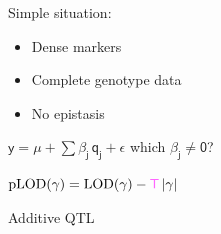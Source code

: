 \documentclass[12pt]{article}
\newcommand{\headsize}{\fontsize{35}{35} \selectfont}
\newcommand{\smallersize}{\fontsize{20}{25} \selectfont}
\newcommand{\smallestsize}{\fontsize{18}{22} \selectfont}
\newcommand{\lod}{\text{LOD}}
\newcommand{\plod}{\text{pLOD}}
\begin{document}
\hfill \begin{minipage}{10in}

Simple situation:

{\smallestsize
\color{myblue}
\begin{itemize}
\item Dense markers
\item Complete genotype data
\item No epistasis

\end{itemize} }

\vspace{2cm}

\centerline{
$\mathsf{y  = \mu + \sum \beta_j \, q_j + \epsilon}$ \hspace{1cm}
       {\color{mypink} which $\mathsf{\beta_j \ne 0}$?}
}

\vspace{2cm}

{\color{myyellow}
$\mathsf{ \plod(\gamma) = \lod(\gamma) -
    {\color{mypink} T} \, |\gamma| }$
}




\end{minipage}



\newpage

\addtocounter{page}{-1}

\headsize \color{myyellow}
\hfill \begin{minipage}{5.75in}
\centering
Additive QTL
\end{minipage}

\vspace{2cm} \color{mywhite} \smallersize
\end{document}
